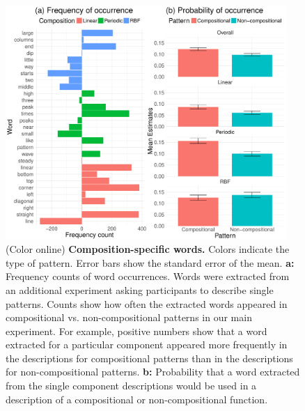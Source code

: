 \documentclass[a4paper,man, floatsintext, natbib]{apa6}
\begin{document}
\begin{figure}[ht!] 
\centerline{\includegraphics[width=0.95\textwidth]{wordanalysis.pdf}}
\caption{(Color online) \textbf{Composition-specific words.} Colors indicate the type of pattern. Error bars show the standard error of the mean. \textbf{a:} Frequency counts of word occurrences. Words were extracted from an additional experiment asking participants to describe single patterns. Counts show how often the extracted words appeared in compositional vs. non-compositional patterns in our main experiment. For example, positive numbers show that a word extracted for a particular component appeared more frequently in the descriptions for compositional patterns than in the descriptions for non-compositional patterns. \textbf{b:} Probability that a word extracted from the single component descriptions would be used in a description of a compositional or non-compositional function.}
\label{fig:wordanalysis}
\end{figure}
\end{document}
